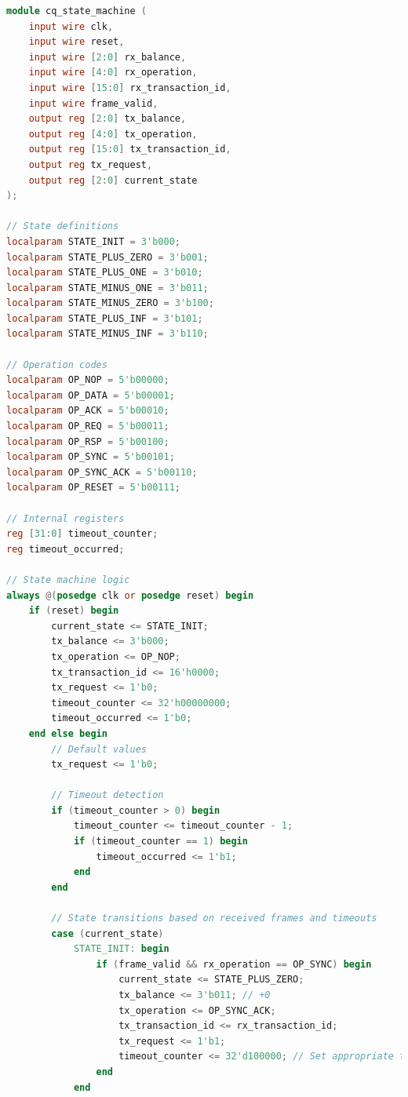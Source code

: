 \documentclass[../OAE-SPEC-MAIN.tex]{subfiles}
\begin{document}
\begin{lstlisting}[language=Verilog]
module cq_state_machine (
    input wire clk,
    input wire reset,
    input wire [2:0] rx_balance,
    input wire [4:0] rx_operation,
    input wire [15:0] rx_transaction_id,
    input wire frame_valid,
    output reg [2:0] tx_balance,
    output reg [4:0] tx_operation,
    output reg [15:0] tx_transaction_id,
    output reg tx_request,
    output reg [2:0] current_state
);

// State definitions
localparam STATE_INIT = 3'b000;
localparam STATE_PLUS_ZERO = 3'b001;
localparam STATE_PLUS_ONE = 3'b010;
localparam STATE_MINUS_ONE = 3'b011;
localparam STATE_MINUS_ZERO = 3'b100;
localparam STATE_PLUS_INF = 3'b101;
localparam STATE_MINUS_INF = 3'b110;

// Operation codes
localparam OP_NOP = 5'b00000;
localparam OP_DATA = 5'b00001;
localparam OP_ACK = 5'b00010;
localparam OP_REQ = 5'b00011;
localparam OP_RSP = 5'b00100;
localparam OP_SYNC = 5'b00101;
localparam OP_SYNC_ACK = 5'b00110;
localparam OP_RESET = 5'b00111;

// Internal registers
reg [31:0] timeout_counter;
reg timeout_occurred;

// State machine logic
always @(posedge clk or posedge reset) begin
    if (reset) begin
        current_state <= STATE_INIT;
        tx_balance <= 3'b000;
        tx_operation <= OP_NOP;
        tx_transaction_id <= 16'h0000;
        tx_request <= 1'b0;
        timeout_counter <= 32'h00000000;
        timeout_occurred <= 1'b0;
    end else begin
        // Default values
        tx_request <= 1'b0;
        
        // Timeout detection
        if (timeout_counter > 0) begin
            timeout_counter <= timeout_counter - 1;
            if (timeout_counter == 1) begin
                timeout_occurred <= 1'b1;
            end
        end
        
        // State transitions based on received frames and timeouts
        case (current_state)
            STATE_INIT: begin
                if (frame_valid && rx_operation == OP_SYNC) begin
                    current_state <= STATE_PLUS_ZERO;
                    tx_balance <= 3'b011; // +0
                    tx_operation <= OP_SYNC_ACK;
                    tx_transaction_id <= rx_transaction_id;
                    tx_request <= 1'b1;
                    timeout_counter <= 32'd100000; // Set appropriate timeout value
                end
            end
            

\end{lstlisting}
\end{document}
